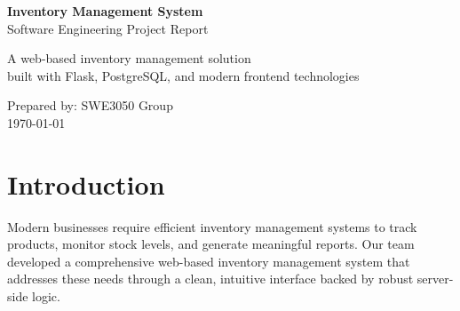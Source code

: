 \documentclass[12pt,a4paper]{article}
\begin{document}
\begin{titlepage}
    \centering
    \vspace*{2cm}
    
    {\Huge\bfseries Inventory Management System}\\[1cm]
    {\Large Software Engineering Project Report}\\[3cm]
    
    
    \vspace{3cm}
    
    {\large A web-based inventory management solution\\
    built with Flask, PostgreSQL, and modern frontend technologies}\\[2cm]
    
    \vfill
    
    {\large Prepared by: SWE3050 Group}\\
    {\normalsize \today}
\end{titlepage}

\newpage
\tableofcontents
\newpage

\section{Introduction}

Modern businesses require efficient inventory management systems to track products, monitor stock levels, and generate meaningful reports. Our team developed a comprehensive web-based inventory management system that addresses these needs through a clean, intuitive interface backed by robust server-side logic.
\end{document}

